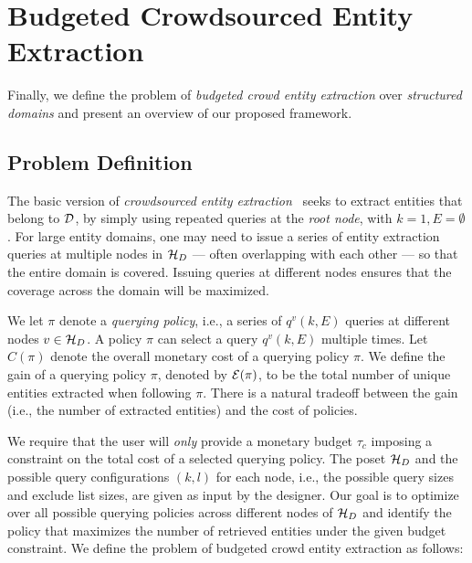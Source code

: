 \section{Budgeted Crowdsourced Entity Extraction}
\label{sec:problem}
Finally, we define the problem of {\em budgeted crowd entity extraction} over {\em structured domains} and present an overview of our proposed framework.
\subsection{Problem Definition}
\label{sec:extraction}
The basic version of {\em crowdsourced entity extraction}~\cite{trushkowsky:2013} seeks to extract entities that belong to $\mathcal{D}$, by simply using repeated queries at the {\em root node}, with $k = 1, E = \emptyset$. For large entity domains, one may need to issue a series of entity extraction queries at multiple nodes in  $\mathcal{H}_D$ --- often overlapping with each other --- so that the entire domain is covered. Issuing queries at different nodes ensures that the coverage across the domain will be maximized. 

We let $\pi$ denote a {\em querying policy}, i.e., a series of $q^v(k,E)$ queries at different nodes $v \in \mathcal{H}_D$. A policy $\pi$ can select a query $q^v(k,E)$ multiple times. Let $C(\pi)$ denote the overall monetary cost of a querying policy $\pi$. We define the gain of a querying policy $\pi$, denoted by $\mathcal{E}(\pi)$, to be the total number of unique entities extracted when following $\pi$. There is a natural tradeoff between the gain (i.e., the number of extracted entities) and the cost of policies. 

We require that the user will {\em only} provide a monetary budget $\tau_c$ imposing a constraint on the total cost of a selected querying policy. The poset $\mathcal{H}_D$ and the possible query configurations $(k,l)$ for each node, i.e., the possible query sizes and exclude list sizes, are given as input by the designer. Our goal is to optimize over all possible querying policies across different nodes of $\mathcal{H}_D$ and identify the policy that maximizes the number of retrieved entities under the given budget constraint. We define the problem of budgeted crowd entity extraction as follows:

